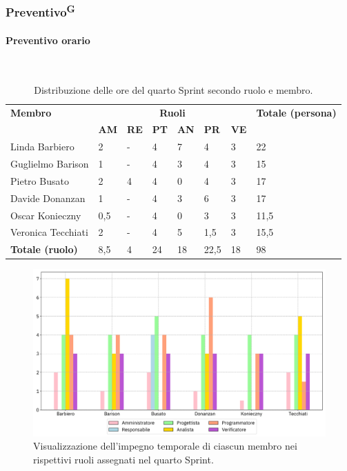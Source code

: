 \documentclass[8pt]{article}
\newcommand{\glossterm}[1]{#1\textsuperscript{G}} %
\newcommand{\subsubsubsection}[1]{\paragraph{#1}\mbox{}\\}
\begin{document}
\subsubsection{\glossterm{Preventivo}}
\subsubsubsection{Preventivo orario}
\begin{table}[ht!]
	\centering
	\begin{tabular}{p{4cm} p{1cm} p{1cm} p{1cm} p{1cm} p{1cm} p{1cm} p{3cm}}
		\toprule
        \textbf{Membro} & \multicolumn{6}{c}{\textbf{Ruoli}} & \textbf{Totale (persona)}\\
		& \textbf{AM} & \textbf{RE} & \textbf{PT} & \textbf{AN} & \textbf{PR} & \textbf{VE}\\
		\midrule
        Linda Barbiero          & 2     & -     & 4     & 7     & 4     & 3     & 22 \\
        Guglielmo Barison       & 1     & -     & 4     & 3     & 4     & 3     & 15\\
        Pietro Busato           & 2     & 4     & 4     & 0     & 4     & 3     & 17 \\
        Davide Donanzan         & 1     & -     & 4     & 3     & 6     & 3     & 17 \\
        Oscar Konieczny         & 0,5     & -     & 4     & 0     & 3     & 3     & 11,5 \\
        Veronica Tecchiati      & 2     & -     & 4     & 5     & 1,5   & 3     & 15,5 \\
        \bottomrule
        \textbf{Totale (ruolo)} & 8,5    & 4     & 24    & 18    & 22,5  & 18   & 98 \\
	\end{tabular}
	\caption{Distribuzione delle ore del quarto Sprint secondo ruolo e membro.}
	\label{table:Distribuzione delle ore del quarto Sprint secondo ruolo e membro}
\end{table}
\begin{figure}[ht!]
    \centering
    \includegraphics[width=15cm]{./images_pdp/istogramma_periodo_4.png}
    \caption{Visualizzazione dell’impegno temporale di ciascun membro nei rispettivi ruoli assegnati
    nel quarto Sprint.}
    \label{figure:Visualizzazione dell’impegno temporale di ciascun membro nei rispettivi ruoli
    assegnati nel quarto Sprint}
\end{figure}
\end{document}
